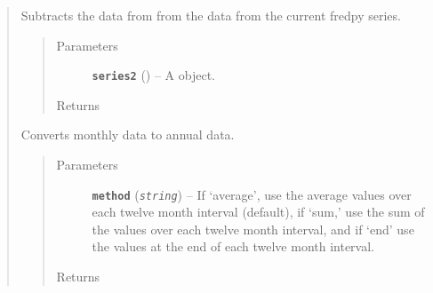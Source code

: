 \documentclass[letterpaper,10pt,english]{sphinxmanual}
\begin{document}
\begin{fulllineitems}
\begin{quote}
\begin{fulllineitems}
\begin{fulllineitems}
\label{series_class:fredpy.series.minus}
Subtracts the data from  from the data from the current fredpy series.
\begin{quote}\begin{description}
\item[{Parameters}] \leavevmode
\textbf{\texttt{series2}} ({\hyperref[series_class:fredpy.series]{}}) -- A  object.

\item[{Returns}] \leavevmode
{\hyperref[series_class:fredpy.series]{}}

\end{description}\end{quote}

\end{fulllineitems}


\end{fulllineitems}


\begin{fulllineitems}
\label{series_class:fredpy.series.monthtoannual}
Converts monthly data to annual data.
\begin{quote}\begin{description}
\item[{Parameters}] \leavevmode
\textbf{\texttt{method}} (\emph{\texttt{string}}) -- If `average', use the average values over each twelve month interval (default), if `sum,' use the sum of the values over each twelve month interval, and if `end' use the values at the end of each twelve month interval.

\item[{Returns}] \leavevmode
{\hyperref[series_class:fredpy.series]{}}

\end{description}\end{quote}

\end{fulllineitems}



\end{quote}
\end{fulllineitems}
\end{document}
